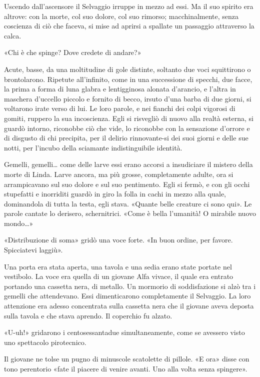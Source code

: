 \documentclass[
a5paper, %
10pt, %
twoside, 
onecolumn, %
openany, %
]{memoir}
\begin{document}
Uscendo dall’ascensore il Selvaggio irruppe in mezzo ad essi. Ma il suo spirito era altrove: con la morte, col suo dolore, col suo rimorso; macchinalmente, senza coscienza di ciò che faceva, si mise ad aprirsi a spallate un passaggio attraverso la calca.

«Chi è che spinge? Dove credete di andare?»

Acute, basse, da una moltitudine di gole distinte, soltanto due voci squittirono o brontolarono. Ripetute all’infinito, come in una successione di specchi, due facce, la prima a forma di luna glabra e lentigginosa alonata d’arancio, e l’altra in maschera d’uccello piccolo e fornito di becco, irsuto d’una barba di due giorni, si voltarono irate verso di lui. Le loro parole, e nei fianchi dei colpi vigorosi di gomiti, ruppero la sua incoscienza. Egli si risvegliò di nuovo alla realtà esterna, si guardò intorno, riconobbe ciò che vide, lo riconobbe con la sensazione d’orrore e di disgusto di chi precipita, per il delirio rinnovante-si dei suoi giorni e delle sue notti, per l’incubo della sciamante indistinguibile identità.

Gemelli, gemelli… come delle larve essi erano accorsi a insudiciare il mistero della morte di Linda. Larve ancora, ma più grosse, completamente adulte, ora si arrampicavano sul suo dolore e sul suo pentimento. Egli si fermò, e con gli occhi stupefatti e inorriditi guardò in giro la folla in cachi in mezzo alla quale, dominandola di tutta la testa, egli stava. «Quante belle creature ci sono qui». Le parole cantate lo derisero, schernitrici. «Come è bella l’umanità! O mirabile nuovo mondo…»

«Distribuzione di soma» gridò una voce forte. «In buon ordine, per favore. Spicciatevi laggiù».

Una porta era stata aperta, una tavola e una sedia erano state portate nel vestibolo. La voce era quella di un giovane Alfa vivace, il quale era entrato portando una cassetta nera, di metallo. Un mormorio di soddisfazione si alzò tra i gemelli che attendevano. Essi dimenticarono completamente il Selvaggio. La loro attenzione era adesso concentrata sulla cassetta nera che il giovane aveva deposta sulla tavola e che stava aprendo. Il coperchio fu alzato.

«U-uh!» gridarono i centosessantadue simultaneamente, come se avessero visto uno spettacolo pirotecnico.

Il giovane ne tolse un pugno di minuscole scatolette di pillole. «E ora» disse con tono perentorio «fate il piacere di venire avanti. Uno alla volta senza spingere».
\end{document}
